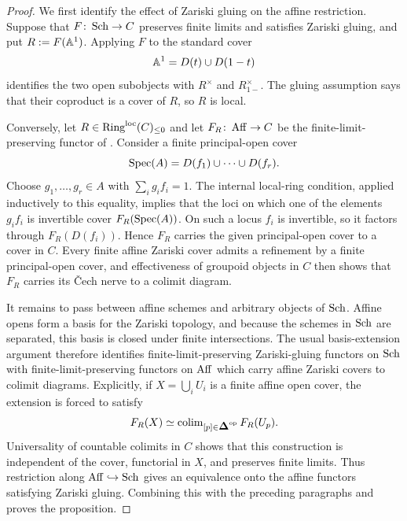 \documentclass[11pt]{book}
\begin{document}
	\begin{proof}
		We first identify the effect of Zariski gluing on the affine restriction. Suppose that $F\colon\operatorname{Sch}\to C$ preserves finite limits and satisfies Zariski gluing, and put $R:=F(\mathbb{A}^1)$. Applying $F$ to the standard cover
		\[
			\mathbb{A}^1=D(t)\cup D(1-t)
		\]
		identifies the two open subobjects with $R^\times$ and $R^\times_{1-}$. The gluing assumption says that their coproduct is a cover of $R$, so $R$ is local.

		Conversely, let $R\in{\textup{Ring}}^{\mathrm{loc}}(C)_{\leq0}$ and let $F_R\colon\operatorname{Aff}\to C$ be the finite-limit-preserving functor of . Consider a finite principal-open cover
		\[
			\operatorname{Spec}(A)=D(f_1)\cup\dots\cup D(f_r).
		\]
		Choose $g_1,\ldots,g_r\in A$ with $\sum_i g_if_i=1$. The internal local-ring condition, applied inductively to this equality, implies that the loci on which one of the elements $g_if_i$ is invertible cover $F_R(\operatorname{Spec}(A))$. On such a locus $f_i$ is invertible, so it factors through $F_R(D(f_i))$. Hence $F_R$ carries the given principal-open cover to a cover in $C$. Every finite affine Zariski cover admits a refinement by a finite principal-open cover, and effectiveness of groupoid objects in $C$ then shows that $F_R$ carries its \v{C}ech nerve to a colimit diagram.

		It remains to pass between affine schemes and arbitrary objects of $\operatorname{Sch}$. Affine opens form a basis for the Zariski topology, and because the schemes in $\operatorname{Sch}$ are separated, this basis is closed under finite intersections. The usual basis-extension argument therefore identifies finite-limit-preserving Zariski-gluing functors on $\operatorname{Sch}$ with finite-limit-preserving functors on $\operatorname{Aff}$ which carry affine Zariski covers to colimit diagrams. Explicitly, if $X=\bigcup_iU_i$ is a finite affine open cover, the extension is forced to satisfy
		\[
			F_R(X)\simeq\colim_{[p]\in\simp\catop}F_R(U_p).
		\]
		Universality of countable colimits in $C$ shows that this construction is independent of the cover, functorial in $X$, and preserves finite limits. Thus restriction along $\operatorname{Aff}\hookrightarrow\operatorname{Sch}$ gives an equivalence onto the affine functors satisfying Zariski gluing. Combining this with the preceding paragraphs and  proves the proposition.
	\end{proof}
\end{document}
